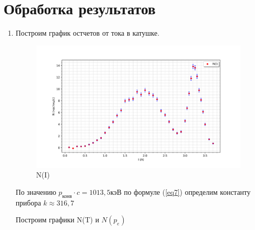 \documentclass[a4paper]{article}
\begin{document}
\newpage

\section{Обработка результатов}

\begin{enumerate}
    \item Построим график остчетов от тока в катушке. 
    \begin{figure}[H]
        \begin{center}
        \includegraphics[scale = 0.54]{N(I).png}
        \caption{N(I)}
        \label{g1}
        \end{center}
    \end{figure}

    По значению $p_{\text{конв}}\cdot c = 1013,5$кэВ по формуле (\ref{eq7}) определим константу прибора
    $k \approx 316,7$

    Построим графики N(T) и $N(p_e)$


\end{enumerate}
\end{document}

